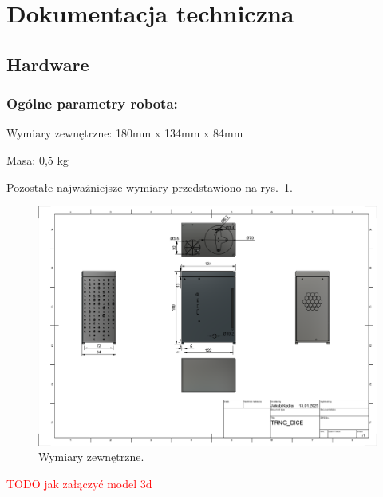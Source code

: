 \section{Dokumentacja techniczna}\label{sec:dokumentacja-techniczna}

\subsection{Hardware}
\label{subsec:hardware}
\subsubsection{Ogólne parametry robota:}
Wymiary zewnętrzne: 180mm x  134mm x 84mm

Masa: 0,5 kg

Pozostałe najważniejsze wymiary przedstawiono na rys.~\ref{fig:wymiary}.
\begin{figure}[H]
    \centering
    \includegraphics[width=0.95\linewidth]{chapters/03-praca-wlasna/figures/wymiary}
    \caption{\label{fig:wymiary}Wymiary zewnętrzne.}
\end{figure}
\textcolor{red}{TODO jak załączyć model 3d}

